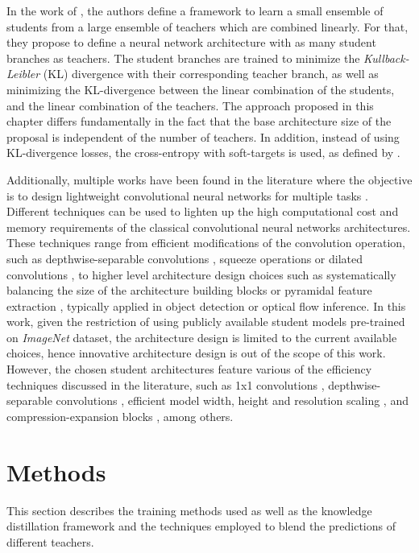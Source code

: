  In the work of \autocite{asif2019}, the authors define a framework to learn a small ensemble of students from a large ensemble of teachers which are combined linearly. For that, they propose to define a neural network architecture with as many student branches as teachers. The student branches are trained to minimize the \textit{Kullback-Leibler} (KL) divergence with their corresponding teacher branch, as well as minimizing the KL-divergence between the linear combination of the students, and the linear combination of the teachers. The approach proposed in this chapter differs fundamentally in the fact that the base architecture size of the proposal is independent of the number of teachers. In addition, instead of using KL-divergence losses, the cross-entropy with soft-targets is used, as defined by \autocite{hinton2015}.

 Additionally, multiple works have been found in the literature where the objective is to design lightweight convolutional neural networks for multiple tasks \autocite{zhou2020, jeon2021, hui2018}. Different techniques can be used to lighten up the high computational cost and memory requirements of the classical convolutional neural networks architectures. These techniques range from efficient modifications of the convolution operation, such as depthwise-separable convolutions \autocite{chollet2017}, squeeze operations \autocite{qiang2021} or dilated convolutions \autocite{Yu2016}, to higher level architecture design choices such as systematically balancing the size of the architecture building blocks \autocite{tan2019} or pyramidal feature extraction \autocite{Lin2017}, typically applied in object detection or optical flow inference. In this work, given the restriction of using publicly available student models pre-trained on \textit{ImageNet} dataset, the architecture design is limited to the current available choices, hence innovative architecture design is out of the scope of this work. However, the chosen student architectures feature various of the efficiency techniques discussed in the literature, such as 1x1 convolutions \autocite{szegedy2017}, depthwise-separable convolutions \autocite{chollet2017}, efficient model width, height and resolution scaling \autocite{tan2019}, and compression-expansion blocks \autocite{howard2017, sandler2018}, among others.
 
 \section{Methods} \label{sec:distillation_methods}
This section describes the training methods used as well as the knowledge distillation framework and the techniques employed to blend the predictions of different teachers.


